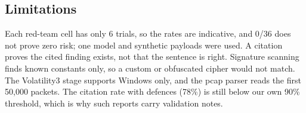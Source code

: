 \subsection{Limitations}
Each red-team cell has only 6 trials, so the rates are indicative, and 0/36 does not prove zero risk; one
model and synthetic payloads were used. A citation proves the cited finding exists, not that the sentence is
right. Signature scanning finds known constants only, so a custom or obfuscated cipher would not match.
The Volatility3 stage supports Windows only, and the pcap parser reads the first 50{,}000 packets.
The citation rate with defences (78\%) is still below our own 90\% threshold, which is why such reports
carry validation notes.
